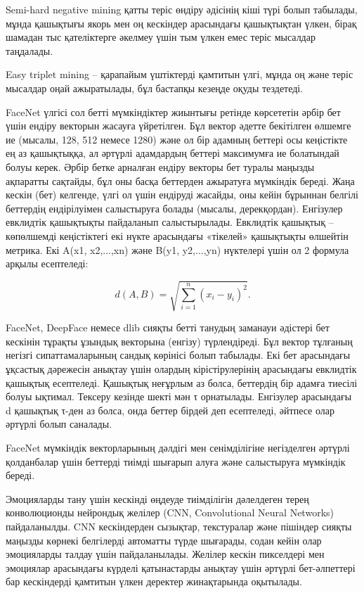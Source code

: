 \begin{multicols}{2}
Semi-hard negative mining қатты теріс өндіру әдісінің кіші түрі болып
табылады, мұнда қашықтығы якорь мен оң кескіндер арасындағы қашықтықтан
үлкен, бірақ шамадан тыс қателіктерге әкелмеу үшін тым үлкен емес теріс
мысалдар таңдалады.

Easy triplet mining -- қарапайым үштіктерді қамтитын үлгі, мұнда оң және
теріс мысалдар оңай ажыратылады, бұл бастапқы кезеңде оқуды тездетеді.

FaceNet үлгісі сол бетті мүмкіндіктер жиынтығы ретінде көрсететін әрбір
бет үшін ендіру векторын жасауға үйретілген. Бұл вектор әдетте
бекітілген өлшемге ие (мысалы, 128, 512 немесе 1280) және ол бір адамның
беттері осы кеңістікте ең аз қашықтыққа, ал әртүрлі адамдардың беттері
максимумға ие болатындай болуы керек. Әрбір бетке арналған ендіру
векторы бет туралы маңызды ақпаратты сақтайды, бұл оны басқа беттерден
ажыратуға мүмкіндік береді. Жаңа кескін (бет) келгенде, үлгі ол үшін
ендіруді жасайды, оны кейін бұрыннан белгілі беттердің ендірілуімен
салыстыруға болады (мысалы, дерекқордан). Енгізулер евклидтік қашықтықты
пайдаланып салыстырылады. Евклидтік қашықтық -- көпөлшемді кеңістіктегі
екі нүкте арасындағы «тікелей» қашықтықты өлшейтін метрика. Екі A(x1,
x2,...,xn) және B(y1, y2,...,yn) нүктелері үшін ол 2 формула арқылы
есептеледі:

\begin{equation}
d(A,B) = \sqrt{\sum_{i = 1}^{n}\left( x_{i} - y_{i} \right)^{2}}.
\end{equation}

FaceNet, DeepFace немесе dlib сияқты бетті танудың заманауи әдістері бет
кескінін тұрақты ұзындық векторына (енгізу) түрлендіреді. Бұл вектор
тұлғаның негізгі сипаттамаларының сандық көрінісі болып табылады. Екі
бет арасындағы ұқсастық дәрежесін анықтау үшін олардың кірістірулерінің
арасындағы евклидтік қашықтық есептеледі. Қашықтық неғұрлым аз болса,
беттердің бір адамға тиесілі болуы ықтимал. Тексеру кезінде шекті мән τ
орнатылады. Енгізулер арасындағы d қашықтық τ-ден аз болса, онда беттер
бірдей деп есептеледі, әйтпесе олар әртүрлі болып саналады.

FaceNet мүмкіндік векторларының дәлдігі мен сенімділігіне негізделген
әртүрлі қолданбалар үшін беттерді тиімді шығарып алуға және салыстыруға
мүмкіндік береді.

Эмоцияларды тану үшін кескінді өңдеуде тиімділігін дәлелдеген терең
конволюционды нейрондық желілер (CNN, Convolutional Neural Networks)
пайдаланылды. CNN кескіндерден сызықтар, текстуралар және пішіндер
сияқты маңызды көрнекі белгілерді автоматты түрде шығарады, содан кейін
олар эмоцияларды талдау үшін пайдаланылады. Желілер кескін пикселдері
мен эмоциялар арасындағы күрделі қатынастарды анықтау үшін әртүрлі
бет-әлпеттері бар кескіндерді қамтитын үлкен деректер жинақтарында
оқытылады.


\end{multicols}
